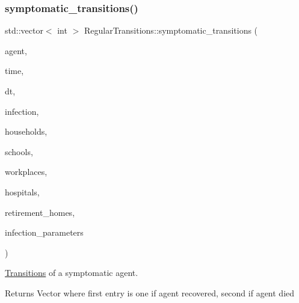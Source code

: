 \subsubsection{\texorpdfstring{symptomatic\+\_\+transitions()}{symptomatic\_transitions()}}
{\footnotesize\ttfamily std\+::vector$<$ int $>$ Regular\+Transitions\+::symptomatic\+\_\+transitions (\begin{DoxyParamCaption}\item[{\hyperlink{classAgent}{Agent} \&}]{agent,  }\item[{const double}]{time,  }\item[{const double}]{dt,  }\item[{\hyperlink{classInfection}{Infection} \&}]{infection,  }\item[{std\+::vector$<$ \hyperlink{classHousehold}{Household} $>$ \&}]{households,  }\item[{std\+::vector$<$ \hyperlink{classSchool}{School} $>$ \&}]{schools,  }\item[{std\+::vector$<$ \hyperlink{classWorkplace}{Workplace} $>$ \&}]{workplaces,  }\item[{std\+::vector$<$ \hyperlink{classHospital}{Hospital} $>$ \&}]{hospitals,  }\item[{std\+::vector$<$ \hyperlink{classRetirementHome}{Retirement\+Home} $>$ \&}]{retirement\+\_\+homes,  }\item[{const std\+::map$<$ std\+::string, double $>$ \&}]{infection\+\_\+parameters }\end{DoxyParamCaption})}



\hyperlink{classTransitions}{Transitions} of a symptomatic agent. 

\begin{DoxyReturn}{Returns}
Vector where first entry is one if agent recovered, second if agent died 
\end{DoxyReturn}
\mbox{\label{classRegularTransitions_aaa59782e3ac59d84006dc32ac783824c}} 
